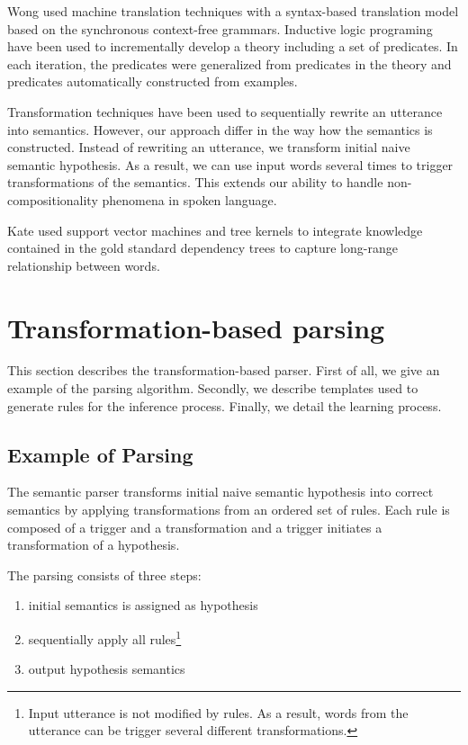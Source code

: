 \documentclass[11pt]{article}
\begin{document}
Wong \cite{wong06} used machine translation techniques with a syntax-based translation model based on the synchronous context-free grammars. 
Inductive logic programing \cite{tang01} have been used to incrementally develop a theory including a set of predicates. In each iteration, the predicates were generalized from predicates in the theory and predicates automatically constructed from examples. 

Transformation techniques \cite{kate05} have been used to sequentially rewrite an utterance into semantics. However, our approach differ in the way how the semantics is constructed. Instead of rewriting an utterance, we transform initial naive semantic hypothesis. As a result, we can use input words several times to trigger transformations of the semantics. This extends our ability to handle non-compositionality phenomena in spoken language.

Kate \cite{kate08} used support vector machines and tree kernels to integrate knowledge contained in the gold standard dependency trees to capture long-range relationship between words. 

\section{Transformation-based parsing} \label{sec:tbl}
This section describes the transformation-based parser. First of all, we give an example of the parsing algorithm. Secondly, we describe  templates used to generate rules for the inference process. Finally, we detail the learning process. 

\subsection{Example of Parsing} \label{sec:tbl:example}
The semantic parser transforms initial naive semantic hypothesis into correct semantics by applying transformations from an ordered set of rules. Each rule is composed of a trigger and a transformation and a trigger initiates a transformation of a hypothesis.

The parsing consists of three steps: 
\begin{enumerate}
  \item initial semantics is assigned as hypothesis
  \item sequentially apply all rules\footnote{Input utterance is not modified by rules. As a result, words from the utterance can be trigger several different transformations.}
  \item output hypothesis semantics
\end{enumerate}
\end{document}
